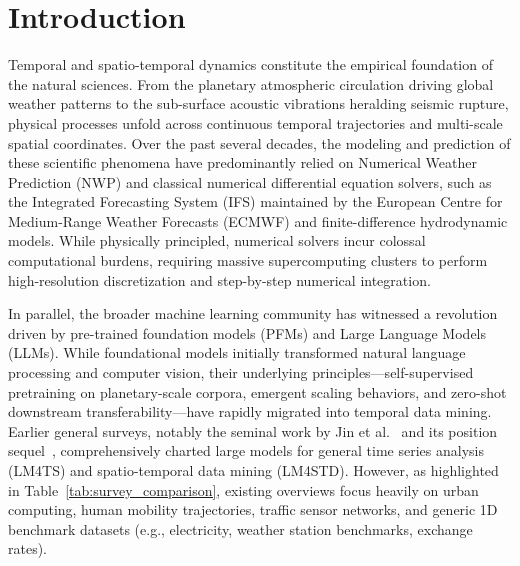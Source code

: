 \section{Introduction}
\label{sec:introduction}

Temporal and spatio-temporal dynamics constitute the empirical foundation of the natural sciences. From the planetary atmospheric circulation driving global weather patterns to the sub-surface acoustic vibrations heralding seismic rupture, physical processes unfold across continuous temporal trajectories and multi-scale spatial coordinates. Over the past several decades, the modeling and prediction of these scientific phenomena have predominantly relied on Numerical Weather Prediction (NWP) and classical numerical differential equation solvers, such as the Integrated Forecasting System (IFS) maintained by the European Centre for Medium-Range Weather Forecasts (ECMWF) and finite-difference hydrodynamic models. While physically principled, numerical solvers incur colossal computational burdens, requiring massive supercomputing clusters to perform high-resolution discretization and step-by-step numerical integration.

In parallel, the broader machine learning community has witnessed a revolution driven by pre-trained foundation models (PFMs) and Large Language Models (LLMs). While foundational models initially transformed natural language processing and computer vision, their underlying principles---self-supervised pretraining on planetary-scale corpora, emergent scaling behaviors, and zero-shot downstream transferability---have rapidly migrated into temporal data mining. Earlier general surveys, notably the seminal work by Jin et al.~\cite{jin2023largemodels} and its position sequel~\cite{jin2024whatcan}, comprehensively charted large models for general time series analysis (LM4TS) and spatio-temporal data mining (LM4STD). However, as highlighted in Table~\ref{tab:survey_comparison}, existing overviews focus heavily on urban computing, human mobility trajectories, traffic sensor networks, and generic 1D benchmark datasets (e.g., electricity, weather station benchmarks, exchange rates).

